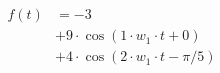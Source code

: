 \begin{center}
\begin{align*}
f(t)
&= -3 \\
&+ 9 \cdot \cos( 1 \cdot w_1 \cdot t + 0) \\
&+ 4 \cdot \cos( 2 \cdot w_1 \cdot t - \pi/5)
\end{align*}
\end{center}
